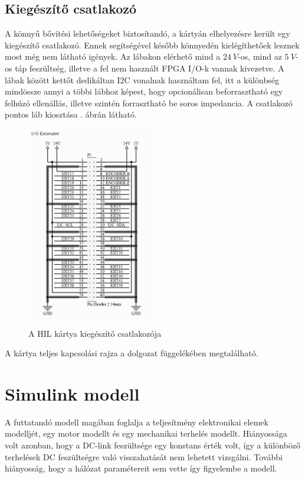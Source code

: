 \subsection{Kiegészítő csatlakozó}

A könnyű bővítési lehetőségeket biztosítandó, a kártyán elhelyezésre került egy kiegészítő csatlakozó. Ennek segítségével később könnyedén kielégíthetőek lesznek most még nem látható igények. Az lábakon elérhető mind a $24\ V$-os, mind az $5\ V$-os táp feszültség, illetve a fel nem használt FPGA I/O-k vannak kivezetve. A lábak között kettőt dedikáltan I2C vonalnak használtam fel, itt a különbség mindössze annyi a többi lábhoz képest, hogy opcionálisan beforrasztható egy felhúzó ellenállás, illetve szintén forrasztható be soros impedancia. A csatlakozó pontos láb kiosztása . ábrán látható.

\begin{figure}[!h]
	\centering
	\includegraphics[width = 0.5\textwidth]{figures/hil_extender.png}
	\caption{A HIL kártya kiegészítő csatlakozója} 
	\label{fig:hil_extender}
\end{figure}

A kártya teljes kapcsolási rajza a dolgozat függelékében megtalálható.

\section{Simulink modell}

A futtatandó modell magában foglalja a teljesítmény elektronikai elemek modelljét, egy motor modellt és egy mechanikai terhelés modellt. Hiányossága volt azonban, hogy a DC-link feszültsége egy konstans érték volt, így a különböző terhelések DC feszültségre való visszahatását nem lehetett vizsgálni. További hiányosság, hogy a hálózat paramétereit sem vette így figyelembe a modell.

